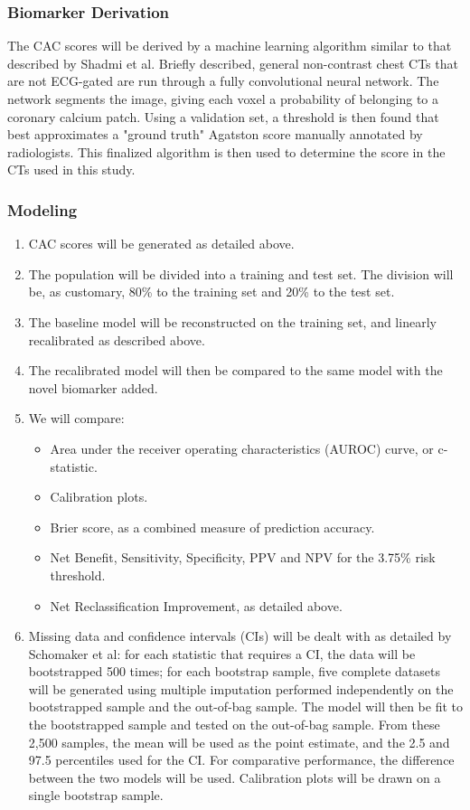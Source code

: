 \documentclass[a4paper,12pt]{article}
\begin{document}
		\subsubsection*{Biomarker Derivation}
		The CAC scores will be derived by a machine learning algorithm similar to that described by Shadmi et al\cite{Shadmi2018}. Briefly described, general non-contrast chest CTs that are not ECG-gated are run through a fully convolutional neural network. The network segments the image, giving each voxel a probability of belonging to a coronary calcium patch. Using a validation set, a threshold is then found that best approximates a "ground truth" Agatston score manually annotated by radiologists. This finalized algorithm is then used to determine the score in the CTs used in this study.
		
		\subsubsection*{Modeling}
		\begin{enumerate}
			\item CAC scores will be generated as detailed above.
			\item The population will be divided into a training and test set. The division will be, as customary, 80\% to the training set and 20\% to the test set.
			\item The baseline model will be reconstructed on the training set, and linearly recalibrated as described above.
			\item The recalibrated model will then be compared to the same model with the novel biomarker added.
			\item We will compare:
			\begin{itemize}
				\item Area under the receiver operating characteristics (AUROC) curve, or c-statistic.
				\item Calibration plots.
				\item Brier score, as a combined measure of prediction accuracy.
				\item Net Benefit, Sensitivity, Specificity, PPV and NPV for the 3.75\% risk threshold.
				\item Net Reclassification Improvement, as detailed above.
			\end{itemize}
			\item Missing data and confidence intervals (CIs) will be dealt with as detailed by Schomaker et al\cite{Schomaker2016}: for each statistic that requires a CI, the data will be bootstrapped 500 times; for each bootstrap sample, five complete datasets will be generated using multiple imputation performed independently on the bootstrapped sample and the out-of-bag sample. The model will then be fit to the bootstrapped sample and tested on the out-of-bag sample. From these 2,500 samples, the mean will be used as the point estimate, and the 2.5 and 97.5 percentiles used for the CI. For comparative performance, the difference between the two models will be used. Calibration plots will be drawn on a single bootstrap sample.
		\end{enumerate}
	
\end{document}
